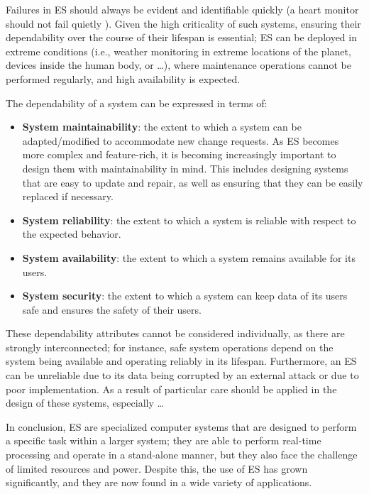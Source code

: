 Failures in ES should always be evident and identifiable quickly (a heart monitor should not fail quietly \cite{MakingEmbeddedSystems}). Given the high criticality of such systems, ensuring their dependability over the course of their lifespan is essential; ES can be deployed in extreme conditions (i.e., weather monitoring in extreme locations of the planet, devices inside the human body, or \dots), where maintenance operations cannot be performed regularly,  and high availability is expected. 

The dependability of a system can be expressed in terms of:
\begin{itemize}
    \item \textbf{System maintainability}: the extent to which a system can be adapted/modified to accommodate new change requests. As ES becomes more complex and feature-rich, it is becoming increasingly important to design them with maintainability in mind. This includes designing systems that are easy to update and repair, as well as ensuring that they can be easily replaced if necessary.
    \item \textbf{System reliability}: the extent to which a system is reliable with respect to the expected behavior.
    \item \textbf{System availability}: the extent to which a system remains available for its users.
    \item \textbf{System security}: the extent to which a system can keep data of its users safe and ensures the safety of their users.
\end{itemize}

These dependability attributes cannot be considered individually, as there are strongly interconnected; for instance, safe system operations depend on the system being available and operating reliably in its lifespan. Furthermore, an ES can be unreliable due to its data being corrupted by an external attack or due to poor implementation. As a result of particular care should be applied in the design of these systems, especially \dots 


In conclusion, ES are specialized computer systems that are designed to perform a specific task within a larger system; they are able to perform real-time processing and operate in a stand-alone manner, but they also face the challenge of limited resources and power. Despite this, the use of ES has grown significantly, and they are now found in a wide variety of applications.



